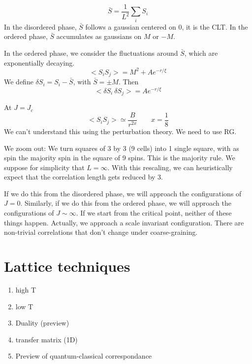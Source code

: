 \documentclass[a4paper]{book}
\theoremstyle{definition}
\theoremstyle{remark}
\begin{document}
\begin{equation}
    \bar{S} = \frac{1}{L^2}\sum_i S_i
\end{equation}
In the disordered phase, $\bar{S}$ follows a gaussian centered on 0, it is the CLT. In the ordered phase, $\bar{S}$ accumulates as gaussians on $M$ or $-M$. \par \medskip 

In the ordered phase, we consider the fluctuations around $\bar{S}$, which are exponentially decaying. 
\begin{equation}
    <S_i S_j> = M^2 + Ae^{-r/\xi}
\end{equation}
We define $\delta S_i = S_i - \bar{S}$, with $\bar{S} = \pm M$. Then 
\begin{equation}
    <\delta S_i~ \delta S_j> = Ae^{-r/\xi}
\end{equation}\medskip 

At \underline{$J = J_c$}
\begin{equation}
    <S_i S_j> \simeq \frac{B}{r^{2x}} \qquad x=\frac{1}{8}
\end{equation}
We can't understand this using the perturbation theory. We need to use RG. \par\medskip 

We zoom out: We turn squares of 3 by 3 (9 cells) into 1 single square, with as spin the majority spin in the square of 9 spins. This is the majority rule. We suppose for simplicity that $L = \infty$. With this rescaling, we can heuristically expect that the correlation length gets reduced by 3. \par 

If we do this from the disordered phase, we will approach the configurations of $J=0$. Similarly, if we do this from the ordered phase, we will approach the configurations of $J \sim \infty$. If we start from the critical point, neither of these things happen. Actually, we approach a scale invariant configuration. There are non-trivial correlations that don't change under coarse-graining.

\chapter{Lattice techniques}
\begin{enumerate}
    \item high T 
    \item low T 
    \item Duality (preview)
    \item transfer matrix (1D)
    \item Preview of quantum-classical correspondance 
\end{enumerate}
 
\end{document}
